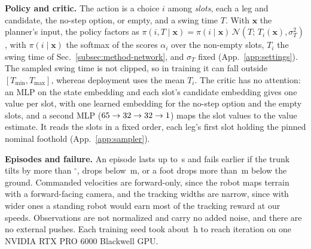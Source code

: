 \noindent\textbf{Policy and critic.}
 The action is a choice $i$ among \corlTotalCandidates{}
\emph{slots}, each a leg and candidate, the no-step option, or empty,
and a swing time $T$. With $\mathbf x$ the planner's input, the policy
factors as $\pi(i, T \mid \mathbf x) = \pi(i \mid \mathbf x)\,\mathcal
N(T;\, T_i(\mathbf x), \sigma_T^2)$, with $\pi(i \mid \mathbf x)$ the
softmax of the scores $\alpha_i$ over the non-empty slots, $T_i$ the
swing time of Sec.~\ref{subsec:method-network}, and $\sigma_T$ fixed
(App.~\ref{app:settings}). The sampled swing time is not clipped, so in
training it can fall outside $[T_{\min}, T_{\max}]$, whereas deployment
uses the mean $T_i$. The critic has no attention: an MLP on the state embedding and each slot's candidate
embedding gives one value per slot, with one learned embedding for the
no-step option and the empty slots, and a second MLP
($65 \to 32 \to 32 \to 1$) maps the slot values to
the value estimate. It reads the slots in a fixed order, each leg's
first slot holding the pinned nominal foothold
(App.~\ref{app:sampler}).

\noindent\textbf{Episodes and failure.}
 An episode lasts up to \corlEpisodeSeconds\,s and fails
earlier if the trunk tilts by more than \corlTiltLimitDeg$^\circ$, drops
below \corlMinBaseHeight\,m, or a foot drops more than
\corlFootDepthLimit\,m below the ground. Commanded velocities are
forward-only, since the robot maps terrain with a forward-facing
camera, and the tracking widths are narrow, since with wider ones a
standing robot would earn most of the tracking reward at our speeds.
Observations are not normalized and carry no added noise, and there are
no external pushes. Each training seed took about
\corlTrainHours\,h to reach iteration \corlOcsCheckpoint{} on
one NVIDIA RTX PRO 6000 Blackwell GPU.


